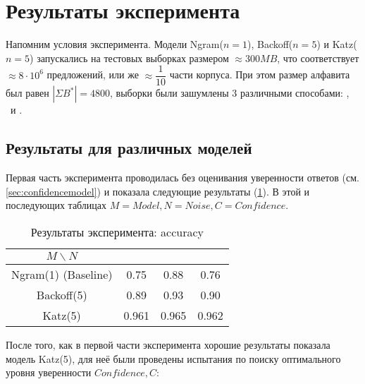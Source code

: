 \section{ Результаты эксперимента }\label{sec:results}

Напомним условия эксперимента. Модели Ngram($n = 1$), Backoff($n = 5$) и Katz($n = 5$) запускались на тестовых выборках размером $\approx 300 MB$, что соответствует $\approx 8 \cdot 10^6$ предложений, или же $\approx \dfrac{1}{10}$ части корпуса. При этом размер алфавита был равен $|\Sigma{B^*}| = 4800$, выборки были зашумлены 3 различными способами: \KG, \BS\ и \MX. 

\subsection{ Результаты для различных моделей }

Первая часть эксперимента проводилась без оценивания уверенности ответов (см. \cref{sec:confidencemodel}) и показала следующие результаты (\cref{table:exp1}). В этой и последующих таблицах $M = Model, N = Noise, C = Confidence$.

\vspace{20pt}

\begin{table}[H]
	\begin{center}
		
		\begin{tabular}{|c|c|c|c|}\hline
			$M \backslash N$ & \KG & \BS & \MX \\ \hline
			Ngram(1) (Baseline) & 0.75 & 0.88 & 0.76 \\
			Backoff(5) & 0.89 & 0.93 & 0.90 \\
			Katz(5) & 0.961 & 0.965 & 0.962 \\ \hline 	
		\end{tabular}
		\caption{Результаты эксперимента: accuracy}
		\label{table:exp1}
	\end{center}
\end{table}

\vspace{20pt}

После того, как в первой части эксперимента хорошие результаты показала модель Katz(5), для неё были проведены испытания по поиску оптимального уровня уверенности $Confidence, C$:

